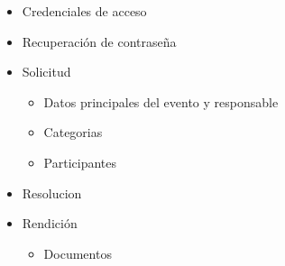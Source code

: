 \begin{itemize}
    \item Credenciales de acceso
    \item Recuperación de contraseña
    \item Solicitud
    \begin{itemize}
        \item Datos principales del evento y responsable
        \item Categorias
        \item Participantes
    \end{itemize}
    \item Resolucion
    \item Rendición
    \begin{itemize}
        \item Documentos
    \end{itemize}
    
\end{itemize}



